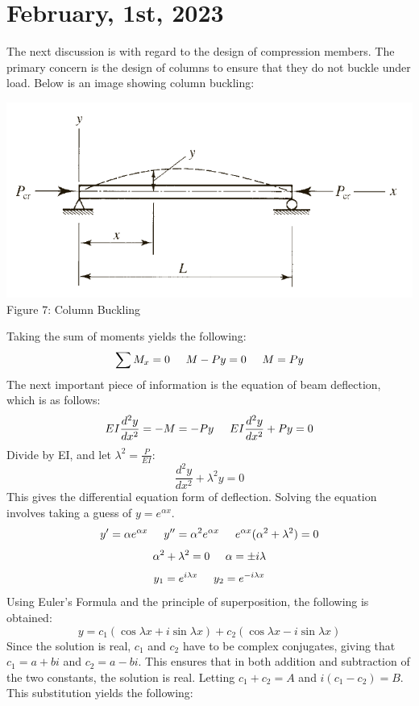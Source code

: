 \documentclass{article}
\begin{document}
\section*{February, 1st, 2023}
The next discussion is with regard to the design of compression members. The primary concern is the design of columns to ensure that they do not buckle under load. Below is an image showing column buckling: 
\begin{center}
    \vspace{3mm}
    \includegraphics[scale=0.7]{fig7.png}
    \vspace{3mm}
    \\Figure 7: Column Buckling
\end{center}
Taking the sum of moments yields the following: 
\[\sum M_x=0\hspace{5mm} M-Py=0\hspace{5mm}M=Py\]
The next important piece of information is the equation of beam deflection, which is as follows: 
\[EI\frac{d^2y}{dx^2}=-M=-Py\hspace{5mm}EI\frac{d^2y}{dx^2}+Py=0\] 
Divide by EI, and let $\lambda^2=\frac{P}{EI}$: 
\[\frac{d^2y}{dx^2}+\lambda^2y=0\] 
This gives the differential equation form of deflection. Solving the equation involves taking a guess of $y=e^{\alpha x}$.
\[y'=\alpha e^{\alpha x}\hspace{5mm}y''=\alpha^2e^{\alpha x}\hspace{5mm}e^{\alpha x}(\alpha^2+\lambda^2)=0\] 
\[\alpha^2+\lambda^2=0\hspace{5mm}\alpha=\pm i\lambda\] 
\[y_1=e^{i\lambda x}\hspace{5mm}y_2=e^{-i\lambda x}\] 
Using Euler's Formula and the principle of superposition, the following is obtained: 
\[y=c_1(\cos\lambda x+i\sin\lambda x)+c_2(\cos\lambda x - i\sin\lambda x)\] 
Since the solution is real, $c_1$ and $c_2$ have to be complex conjugates, giving that $c_1=a+bi$ and $c_2=a-bi$. This ensures that in both addition and subtraction of the two constants, the solution is real. Letting $c_1+c_2=A$ and $i(c_1-c_2)=B$. This substitution yields the following: 
\end{document}
